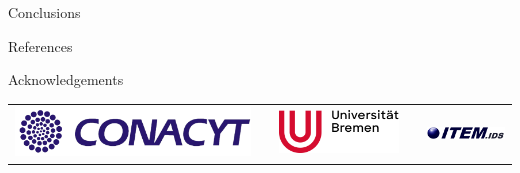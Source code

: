 \documentclass[final]{beamer}
\newlength{\onecolwid}
\begin{document}
\begin{frame}[t]
\begin{columns}[t]
\begin{column}{\onecolwid}
\begin{block}{Conclusions}
\end{block}


\begin{block}{References}

\nocite{*} %
\small{
\vspace{0.75in}}

\end{block}



\begin{block}{Acknowledgements}
\begin{center}
	\small{}
	
		\begin{tabular}{lcccr}\toprule
			\includegraphics[width=0.30\linewidth]{../figures/logo_CONACYT.png} & &
			\includegraphics[width=0.20\linewidth]{../figures/logo_ub_2021.png} & & \includegraphics[width=0.25\linewidth]{../figures/logo_item_ids.png}
		\end{tabular}
\end{center}
\end{block}

\begin{center}

\end{center}

\end{column} %

\end{columns} %

\end{frame} %
\end{document}
